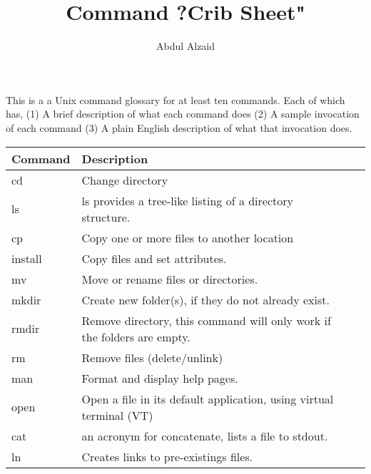 \documentclass[12pt, oneside]{article}   	%
\title{Command ?Crib Sheet"}
\author{Abdul Alzaid}
\begin{document}
\maketitle
This is a a Unix command glossary for at least ten commands. Each of which has, (1) A brief description of what each command does (2) A sample invocation of each command (3) A plain English description of what that invocation does.


\begin{center}
    \begin{tabular}{| l | l | l | l |}
    \hline
    Command & Description  \\ \hline
    cd & Change directory  \\ \hline
    ls &  ls provides a tree-like listing of a directory structure.  \\ \hline
    cp & Copy one or more files to another location  \\ \hline
    install & Copy files and set attributes.  \\ \hline
    mv & Move or rename files or directories.  \\ \hline
    mkdir & Create new folder(s), if they do not already exist.  \\ \hline
    rmdir & Remove directory, this command will only work if the folders are empty.  \\ \hline
    rm & Remove files (delete/unlink)  \\ \hline
    man & Format and display help pages.  \\ \hline
    open & Open a file in its default application, using virtual terminal (VT)  \\ \hline
    cat &  an acronym for concatenate, lists a file to stdout.  \\ \hline
    ln & Creates links to pre-existings files.  \\ \hline
        \end{tabular}
\end{center}
\end{document}
